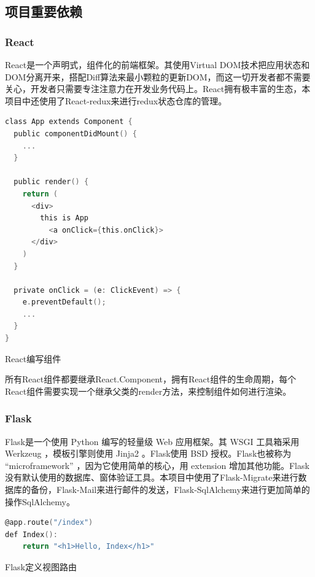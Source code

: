 \subsection{项目重要依赖}

\subsubsection{React}

React是一个声明式，组件化的前端框架。其使用Virtual DOM技术把应用状态和DOM分离开来，搭配Diff算法来最小颗粒的更新DOM，而这一切开发者都不需要关心，开发者只需要专注注意力在开发业务代码上。React拥有极丰富的生态，本项目中还使用了React-redux来进行redux状态仓库的管理。

\begin{lstlisting}[language=C]
class App extends Component {
  public componentDidMount() {
  	...
  }
  
  public render() {
	return (
	  <div>
	    this is App
	      <a onClick={this.onClick}>
	  </div>
	)
  }
	  
  private onClick = (e: ClickEvent) => {
    e.preventDefault();
    ...
  }
}
\end{lstlisting}

\begin{center}
	{\small React编写组件}
\end{center}

所有React组件都要继承React.Component，拥有React组件的生命周期，每个React组件需要实现一个继承父类的render方法，来控制组件如何进行渲染。

\subsubsection{Flask}

Flask是一个使用 Python 编写的轻量级 Web 应用框架。其 WSGI 工具箱采用 Werkzeug ，模板引擎则使用 Jinja2 。Flask使用 BSD 授权。Flask也被称为 “microframework” ，因为它使用简单的核心，用 extension 增加其他功能。Flask没有默认使用的数据库、窗体验证工具。本项目中使用了Flask-Migrate来进行数据库的备份，Flask-Mail来进行邮件的发送，Flask-SqlAlchemy来进行更加简单的操作SqlAlchemy。

\begin{lstlisting}[language=C]
@app.route("/index")
def Index():
	return "<h1>Hello, Index</h1>"
\end{lstlisting}

\begin{center}
	{\small Flask定义视图路由}
\end{center}

